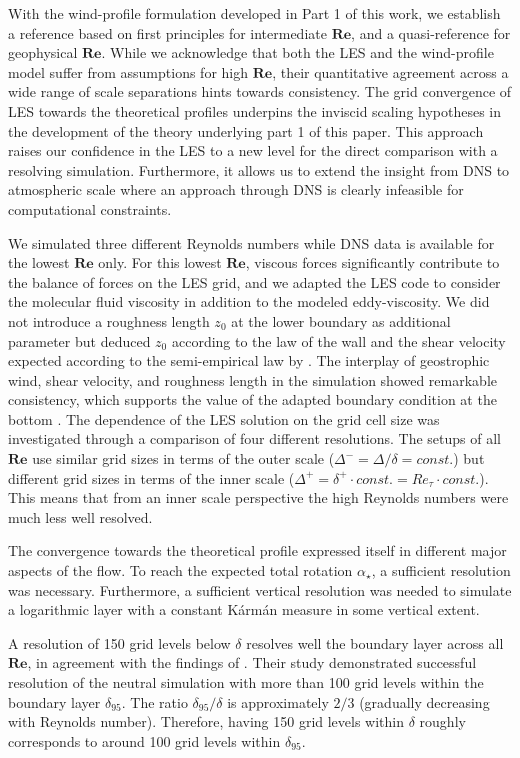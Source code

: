 \documentclass[smallcondensed,draft]{svjour3}
\newcommand{\RE}{\mathbf{Re}}
\begin{document}
With the wind-profile formulation developed in Part 1 of this work, we establish a reference based on first principles for intermediate $\RE$, and a quasi-reference for geophysical $\RE$. While we acknowledge that both the LES and the wind-profile model suffer from assumptions for high $\RE$, their quantitative agreement across a wide range of scale separations hints towards consistency. The grid convergence of LES towards the theoretical profiles underpins the inviscid scaling hypotheses in the development of the theory underlying part 1 of this paper. This approach raises our confidence in the LES to a new level for the direct comparison with a resolving simulation. Furthermore, it allows us to extend the insight from DNS to atmospheric scale where an approach through DNS is clearly infeasible for computational constraints. 


We simulated three different Reynolds numbers while DNS data is available for the lowest $\RE$ only. For this lowest $\RE$, viscous forces significantly contribute to the balance of forces on the LES grid, and we adapted the LES code to consider the molecular fluid viscosity in addition to the modeled eddy-viscosity. We did not introduce a roughness length $z_0$ at the lower boundary as additional parameter but deduced $z_0$ according to the law of the wall and the shear velocity expected according to the semi-empirical law by \cite{spalart1989theoretical}. The interplay of geostrophic wind, shear velocity, and roughness length in the simulation showed remarkable consistency, which supports the value of the adapted boundary condition at the bottom \citep{maronga2017formulation}. The dependence of the LES solution on the grid cell size was investigated through a comparison of four different resolutions. The setups of all $\RE$ use similar grid sizes in terms of the outer scale ($\Delta^-=\Delta/\delta=const.$) but different grid sizes in terms of the inner scale ($\Delta^+=\delta^+\cdot const. = Re_\tau\cdot const.$). This means that from an inner scale perspective the high Reynolds numbers were much less well resolved.

The convergence towards the theoretical profile expressed itself in different major aspects of the flow. To reach the expected total rotation $\alpha_\star$, a sufficient resolution was necessary. Furthermore, a sufficient vertical resolution was needed to simulate a logarithmic layer with a constant K\'arm\'an measure in some vertical extent.

A resolution of 150 grid levels below $\delta$ resolves well the boundary layer across all $\RE$, in agreement with the findings of \cite{wurps2020grid}. Their study demonstrated successful resolution of the neutral simulation with more than 100 grid levels within the boundary layer $\delta_{95}$. The ratio $\delta_{95}/\delta$ is approximately $2/3$ (gradually decreasing with Reynolds number). Therefore, having 150 grid levels within $\delta$ roughly corresponds to around 100 grid levels within $\delta_{95}$.
\end{document}
